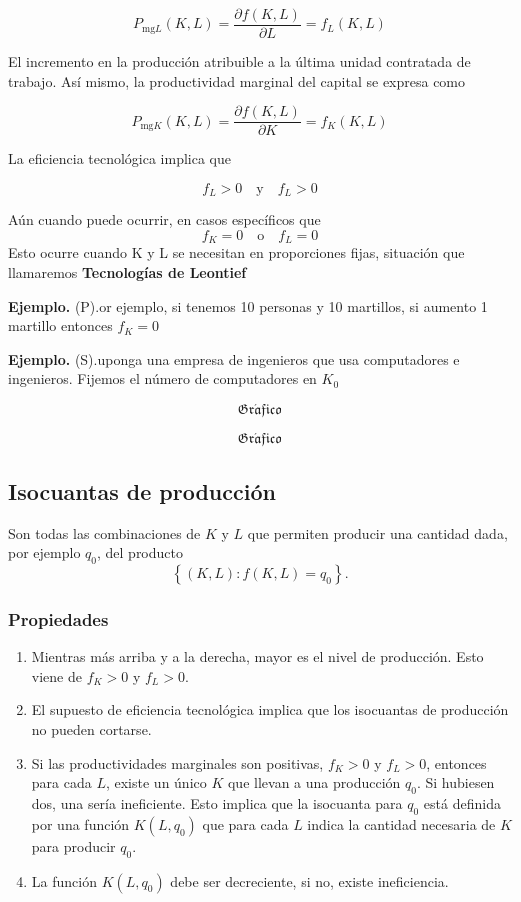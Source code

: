\documentclass{report}
\newcommand{\GRAF}{\begin{center}$$\mathfrak{Gr\acute{a}fico}$$\end{center}}
\newenvironment{example}[1]{\noindent\setlength{\parskip}{0pt}\textbf{Ejemplo.} (#1).}{}
\begin{document}
\[
P_{\text{mg}L}\!\left( K,L \right) = \frac{\partial f\!\left( K,L \right) }{\partial L}  = f_{L}\!\left( K,L \right) 
\] 

El incremento en la producción atribuible a la última unidad contratada de trabajo. Así mismo, la productividad marginal del capital se expresa como

\[
P_{\text{mg}K}\!\left( K,L \right) = \frac{\partial f\!\left( K,L \right) }{\partial K} = f_{K}\!\left( K,L \right) 
\] 

La eficiencia tecnológica implica que 

\[
f_L > 0 \quad \text{y} \quad f_L > 0
\] 

Aún cuando puede ocurrir, en casos específicos que
\[
f_K = 0 \quad \text{o} \quad f_L = 0
\] 
Esto ocurre cuando K y L se necesitan en proporciones fijas, situación que llamaremos \textbf{Tecnologías de Leontief}

\begin{example}
Por ejemplo, si tenemos 10 personas y 10 martillos, si aumento 1 martillo entonces $f_K=0$
\end{example}

\begin{example}
    Suponga una empresa de ingenieros que usa computadores e ingenieros. Fijemos el número de computadores en $K_0$
    \GRAF
    \GRAF
\end{example}


\subsection{Isocuantas de producción}

Son todas las combinaciones de $K$ y $L$ que permiten producir una cantidad dada, por ejemplo $q_0$, del producto
\[
\left\{\left(K,L\right):f\!\left(K,L\right)=q_0\right\}\text{.}
\]

\subsubsection{Propiedades}

\begin{enumerate}
\item Mientras más arriba y a la derecha, mayor es el nivel de producción. Esto viene de $f_K>0$ y $f_L>0$.
\item El supuesto de eficiencia tecnológica implica que los isocuantas de producción no pueden cortarse.
\item Si las productividades marginales son positivas, $f_K>0$ y $f_L>0$, entonces para cada $L$, existe un único $K$ que llevan a una producción $q_0$. Si hubiesen dos, una sería ineficiente. Esto implica que la isocuanta para $q_0$ está definida por una función $K\!\left(L,q_0\right)$ que para cada $L$ indica la cantidad necesaria de $K$ para producir $q_0$.
\item La función $K\!\left(L,q_0\right)$ debe ser decreciente, si no, existe ineficiencia.
\end{enumerate}
\end{document}
